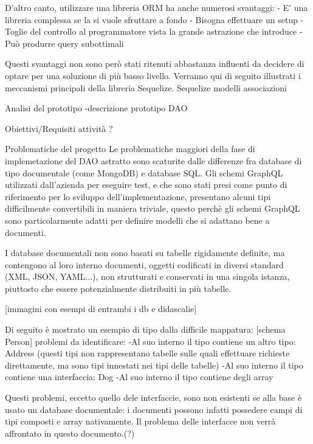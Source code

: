         D'altro canto, utilizzare una libreria ORM ha anche numerosi svantaggi:
            - E' una libreria complessa se la si vuole sfruttare a fondo
            - Bisogna effettuare un setup
            - Toglie del controllo al programmatore vista la grande astrazione che introduce
            - Può produrre query subottimali

        Questi svantaggi non sono però stati ritenuti abbastanza influenti da decidere di optare per una soluzione di più basso livello.
        Verranno qui di seguito illustrati i meccanismi principali della libreria Sequelize.
        Sequelize
        modelli
        associazioni
    
    Analisi del prototipo
        -descrizione prototipo DAO

    Obiettivi/Requisiti attività ?

    Problematiche del progetto
        Le problematiche maggiori della fase di implemetazione del DAO astratto sono scaturite dalle differenze fra database di tipo documentale (come MongoDB) e database SQL.
        Gli schemi GraphQL utilizzati dall'azienda per eseguire test, e che sono stati presi come punto di riferimento per lo sviluppo dell'implementazione, presentano alcuni tipi difficilmente convertibili in maniera triviale, questo perchè gli schemi GraphQL sono
        particolarmente adatti per definire modelli che si adattano bene a documenti.

        I database documentali non sono basati su tabelle rigidamente definite, ma contengono al loro interno documenti, oggetti codificati in diversi standard (XML, JSON, YAML...), non strutturati e conservati in una singola istanza, piuttosto che essere potenzialmente distribuiti in più tabelle.
        
        [immagini con esempi di entrambi i db e didascalie]

        Di seguito è mostrato un esempio di tipo dalla difficile mappatura:
        [schema Person]
        problemi da identificare:
            -Al suo interno il tipo contiene un altro tipo: Address (questi tipi non rappresentano tabelle sulle quali effettuare richieste direttamente, ma sono tipi innestati nei tipi delle tabelle)
            -Al suo interno il tipo contiene una interfaccia: Dog
            -Al suo interno il tipo contiene degli array

        Questi problemi, eccetto quello dele interfaccie, sono non esistenti se alla base è usato un database documentale: i documenti possono infatti possedere campi di tipi composti e array nativamente. 
        Il problema delle interfacce non verrà affrontato in questo documento.(?)

